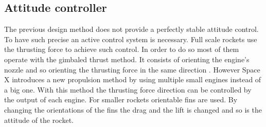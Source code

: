 \subsection{Attitude controller}
The previous design method does not provide a perfectly stable attitude control. To have such precise an active control system is necessary. Full scale rockets use the thrusting force to achieve such control. In order to do so most of them operate with the gimbaled thrust method. It consists of orienting the engine's nozzle and so orienting the thrusting force in the same direction \cite{web:rocketnasa}. However Space X introduces a new propulsion method by using multiple small engines instead of a big one. With this method the thrusting force direction can be controlled by the output of each engine. For smaller rockets orientable fins are used. By changing the orientations of the fins the drag and the lift is changed and so is the attitude of the rocket.